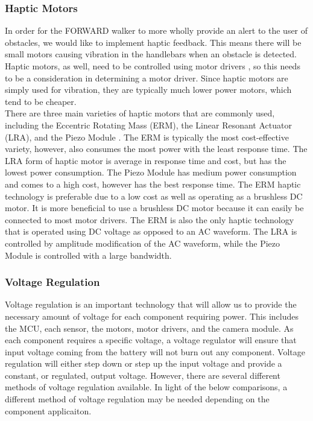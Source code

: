 \subsubsection{Haptic Motors}

\noindent In order for the FORWARD walker to more wholly provide an alert to the user of obstacles, we would like to implement haptic feedback. This means there will be small motors causing vibration in the handlebars when an obstacle is detected. Haptic motors, as well, need to be controlled using motor drivers \cite{RCBeacon}, so this needs to be a consideration in determining a motor driver. Since haptic motors are simply used for vibration, they are typically much lower power motors, which tend to be cheaper. \\

\noindent There are three main varieties of haptic motors that are commonly used, including the Eccentric Rotating Mass (ERM), the Linear Resonant Actuator (LRA), and the Piezo Module \cite{nfpmotor}. The ERM is typically the most cost-effective variety, however, also consumes the most power with the least response time. The LRA form of haptic motor is average in response time and cost, but has the lowest power consumption. The Piezo Module has medium power consumption and comes to a high cost, however has the best response time. The ERM haptic technology is preferable due to a low cost as well as operating as a brushless DC motor. It is more beneficial to use a brushless DC motor because it can easily be connected to most motor drivers. The ERM is also the only haptic technology that is operated using DC voltage as opposed to an AC waveform. The LRA is controlled by amplitude modification of the AC waveform, while the Piezo Module is controlled with a large bandwidth.\\

\subsubsection{Voltage Regulation}

\noindent Voltage regulation is an important technology that will allow us to provide the necessary amount of voltage for each component requiring power. This includes the MCU, each sensor, the motors, motor drivers, and the camera module. As each component requires a specific voltage, a voltage regulator will ensure that input voltage coming from the battery will not burn out any component. Voltage regulation will either step down or step up the input voltage and provide a constant, or regulated, output voltage. However, there are several different methods of voltage regulation available. In light of the below comparisons, a different method of voltage regulation may be needed depending on the component applicaiton.\\

